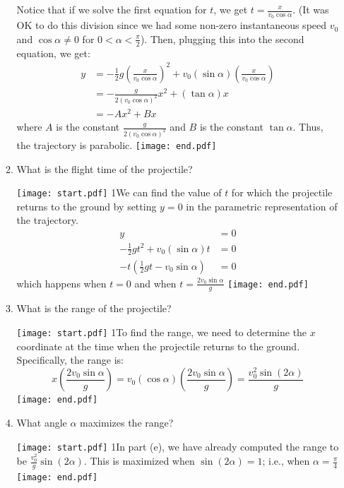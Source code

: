 \documentclass[12pt]{article}
\begin{document}
\begin{enumerate}
\begin{enumerate}
{{{Notice that if we solve the first equation for $t$, we get $t=\frac{x}{v_0\cos{\alpha}}$.  (It was OK to do this division since we had some non-zero instantaneous speed $v_0$ and $\cos{\alpha}\neq 0$ for $0 < \alpha <\frac{\pi}{2}$).  Then, plugging this into the second equation, we get:
\begin{align*}
y&=-\frac{1}{2}g\left(\frac{x}{v_0\cos{\alpha}} \right)^2+v_0(\sin\alpha)\left(\frac{x}{v_0\cos{\alpha}}\right)\\
&=-\frac{g}{2(v_0\cos\alpha)^2}x^2+(\tan{\alpha})x\\
&=-Ax^2+Bx
\end{align*}
where $A$ is the constant $\frac{g}{2(v_0\cos\alpha)^2}$ and $B$ is the constant $\tan\alpha$.  Thus, the trajectory is parabolic.
}}}
\texttt{[image: end.pdf]}


\item What is the flight time of the projectile?

\texttt{[image: start.pdf]}
{{{1\linewidth}{We can find the value of $t$ for which the projectile returns to the ground by setting $y=0$ in the parametric representation of the trajectory.
\begin{align*}
y&=0\\
-\frac{1}{2}gt^2+v_0(\sin\alpha)t &=0\\
-t\left(\frac{1}{2}gt-v_0\sin\alpha\right)&=0
\end{align*}
which happens when $t=0$ and when $t=\frac{2v_0\sin\alpha}{g}$
}}}
\texttt{[image: end.pdf]}


\item What is the range of the projectile?

\texttt{[image: start.pdf]}
{{{1\linewidth}{To find the range, we need to determine the $x$ coordinate at the time when the projectile returns to the ground.  Specifically, the range is: $$x\left(\frac{2v_0\sin\alpha}{g}\right)=v_0(\cos\alpha)\left(\frac{2v_0\sin\alpha}{g}\right)=\frac{v_0^2\sin{(2\alpha)}}{g}$$
}}}
\texttt{[image: end.pdf]}


\newpage

\item What angle $\alpha$ maximizes the range?

\texttt{[image: start.pdf]}
{{{1\linewidth}{In part (e), we have already computed the range to be $\frac{v_0^2}{g}\sin{(2\alpha)}$.  This is maximized when $\sin(2\alpha)=1$; i.e., when $\alpha =\frac{\pi}{4}$
}}}
\texttt{[image: end.pdf]}


\end{enumerate}


\end{enumerate}
\end{document}
